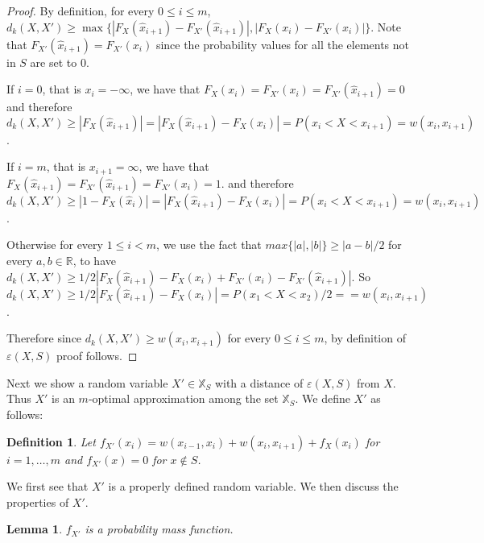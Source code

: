 \documentclass{article}
\newtheorem{lemma}[thm]{Lemma}
\newtheorem{definition}[thm]{Definition}
\begin{document}
\begin{proof}
	
	
	By definition, for every $0\leq i\leq m$, $d_k(X,X') \geq \max \{|F_X(\hat x_{i+1}) - F_{X'}(\hat x_{i+1})|,|F_X(x_i) - F_{X'}(x_i)| \}$. Note that $F_{X'}(\hat x_{i+1})=F_{X'}(x_i)$ since the probability values for all the elements not in $S$ are set to $0$.
	
	If $i=0$, that is $x_i=-\infty$, we have that $F_X(x_i)=F_{X'}(x_i)=F_{X'}(\hat x_{i+1})=0$ and therefore $d_k(X,X') \geq |F_X(\hat x_{i+1})| = |F_X(\hat x_{i+1}) - F_{X}(x_i)| =  P(x_i < X < x_{i+1})= w(x_i,x_{i+1})$.
	
	If $i =m$, that is $x_{i+1}=\infty$, we have that $F_X(\hat x_{i+1})=F_{X'}(\hat x_{i+1})=F_{X'}(x_i)=1$. 
	and therefore $d_k(X,X') \geq |1-F_X(\hat x_i)| = |F_X(\hat x_{i+1}) - F_{X}(x_i)| =  P(x_i < X < x_{i+1}) = w(x_i,x_{i+1})$. 
	
	
	Otherwise for every $1\leq i< m$,  we use the fact that $max\{|a|,|b|\} \geq |a-b|/2$ for every $a,b\in\mathbb{R}$, to have $d_k(X,X') \geq 1/2| F_X(\hat x_{i+1}) - F_X(x_i) + F_{X'}(x_i) -F_{X'}(\hat x_{i+1})|$. So $d_k(X,X') \geq 1/2| F_X(\hat x_{i+1}) - F_X(x_i) | =P(x_1 < X < x_2)/2 == w(x_i,x_{i+1})$. 
	
	Therefore since $d_k(X,X') \geq  w(x_i,x_{i+1})$ for every $0\leq i\leq m$, by definition of $\varepsilon(X,S)$ proof follows.
\end{proof}



Next we show a random variable $X'\in\mathbb{X}_S$ with a distance of $\varepsilon(X,S)$ from $X$. Thus $X'$ is an $m$-optimal approximation among the set $\mathbb{X}_S$. We define $X'$ as follows:

\begin{definition}\label{def:construction}
	Let $f_{X'}(x_{i}) = w(x_{i-1},x_i) + w(x_i,x_{i+1}) + f_{X}(x_i)$ for $i=1,\dots,m$ and $f_{X'}(x)=0$ for $x \notin S$.
\end{definition}

We first see that $X'$ is a properly defined random variable. We then discuss the properties of $X'$.

\begin{lemma}
	$f_{X'}$ is a probability mass function. 
\end{lemma}
\end{document}
